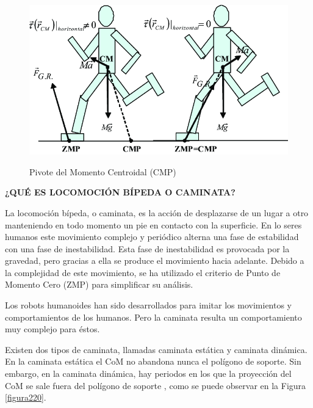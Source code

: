\begin{itemize}
\begin{figure}[H]
\centering
{\includegraphics[scale=0.4]{imagenes/apartado_2/219_centroidal_moment_pivot}}
\caption{Pivote del Momento Centroidal (CMP)}
\label{figura219}
\end{figure}

\end{itemize}

\textbf{¿QUÉ ES LOCOMOCIÓN BÍPEDA O CAMINATA?}

La locomoción bípeda, o caminata, es la acción de desplazarse de un lugar a otro manteniendo en todo momento un pie en contacto con la superficie. En lo seres humanos este movimiento complejo y periódico alterna una fase de estabilidad con una fase de inestabilidad. Esta fase de inestabilidad es provocada por la gravedad, pero gracias a ella se produce el movimiento hacia adelante. Debido a la complejidad de este movimiento, se ha utilizado el criterio de Punto de Momento Cero (ZMP) para simplificar su análisis. 

Los robots humanoides han sido desarrollados para imitar los movimientos y comportamientos de los humanos. Pero la caminata resulta un comportamiento muy complejo para éstos. 

Existen dos tipos de caminata, llamadas caminata estática y  caminata dinámica. En la caminata estática el CoM no abandona nunca el polígono de soporte. Sin embargo, en la caminata dinámica, hay periodos en los que la proyección del CoM se sale fuera del polígono de soporte \cite{ref10}, como se puede observar en la Figura \ref{figura220}.

